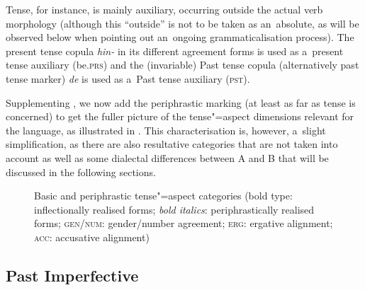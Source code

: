 Tense, for instance, is mainly auxiliary, occurring outside the actual verb morphology (although this ``outside'' is not to be taken as an~absolute, as will be observed below when pointing out an~ongoing grammaticalisation process). The present tense copula \textit{hin-} in its different agreement forms is used as a~present tense auxiliary (be.\textsc{prs}) and the (invariable) Past tense copula (alternatively past tense marker) \textit{de} is used as a~Past tense auxiliary (\textsc{pst}).



Supplementing , we now add the periphrastic marking (at least as far as tense is concerned) to get the fuller picture of the tense"=aspect dimensions relevant for the language, as illustrated in . This characterisation is, however, a~slight simplification, as there are also resultative categories that are not taken into account as well as some dialectal differences between A and B that will be discussed in the following sections.


\begin{figure}[ht]
\centering
{}
\caption{Basic and periphrastic tense"=aspect categories (bold type: inflectionally realised forms;
  \textit{bold italics}: periphrastically realised forms; \textsc{gen/num}: gender/number agreement;
  \textsc{erg}: ergative alignment; \textsc{acc}: accusative alignment)\label{fig:9-2}}
\end{figure}

\subsection{Past Imperfective}
\label{subsec:9-1-6}


